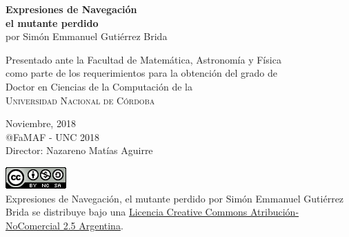 \begin{titlepage}

\begin{center}
{\LARGE \textbf{Expresiones de Navegaci\'on}}\\ 
{\LARGE \textbf{el mutante perdido}}\\ 
\vspace{4mm}
{\Large por Sim\'on Emmanuel Guti\'errez Brida}\\

\vspace{50mm}

Presentado ante la Facultad de Matem\'atica, Astronom\'ia y F\'isica\\
como parte de los requerimientos para la obtenci\'on del grado de\\
Doctor en Ciencias de la Computaci\'on de la\\
\textsc{Universidad Nacional de C\'ordoba}\\
 
\vspace{50mm}

Noviembre, 2018\\
@FaMAF - UNC 2018\\
{\Large Director: Nazareno Mat\'ias Aguirre}

\vspace{10mm}
\href{https://i.creativecommons.org/l/by-nc/2.5/ar/88x31.png}{\includegraphics{images/licencia-famaf.png}}\\
{Expresiones de Navegaci\'on, el mutante perdido por Sim\'on Emmanuel Guti\'errez Brida se distribuye bajo una \href{http://creativecommons.org/licenses/by-nc/2.5/ar/}{Licencia Creative Commons Atribuci\'on-NoComercial 2.5 Argentina}.}
\end{center}  
\end{titlepage} 



